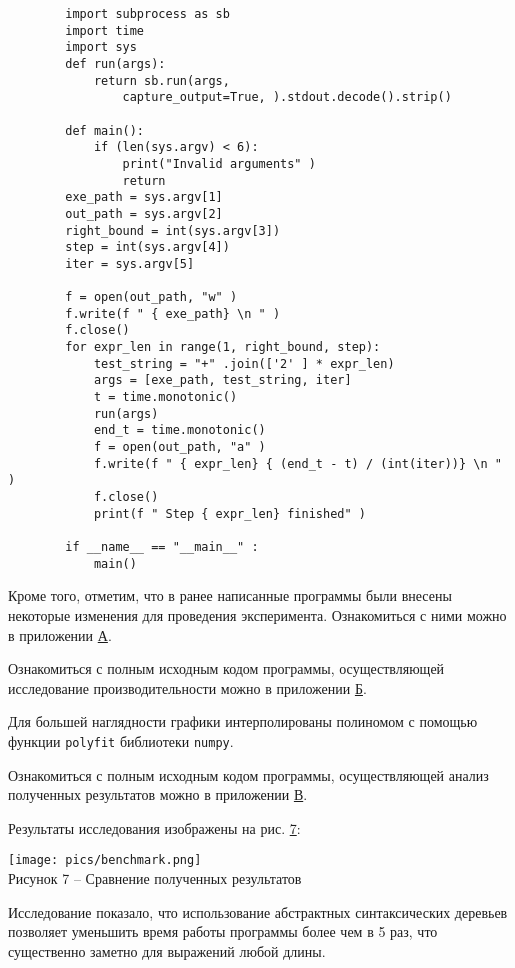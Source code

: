 \documentclass[bachelor, och, coursework]{SCWorks}
\begin{document}
    \begin{verbatim}
        import subprocess as sb
        import time
        import sys
        def run(args):
            return sb.run(args,
                capture_output=True, ).stdout.decode().strip()

        def main():
            if (len(sys.argv) < 6):
                print("Invalid arguments" )
                return
        exe_path = sys.argv[1]
        out_path = sys.argv[2]
        right_bound = int(sys.argv[3])
        step = int(sys.argv[4])
        iter = sys.argv[5]

        f = open(out_path, "w" )
        f.write(f " { exe_path} \n " )
        f.close()
        for expr_len in range(1, right_bound, step):
            test_string = "+" .join(['2' ] * expr_len)
            args = [exe_path, test_string, iter]
            t = time.monotonic()
            run(args)
            end_t = time.monotonic()
            f = open(out_path, "a" )
            f.write(f " { expr_len} { (end_t - t) / (int(iter))} \n " )
            f.close()
            print(f " Step { expr_len} finished" )

        if __name__ == "__main__" :
            main()
    \end{verbatim}

    Кроме того, отметим, что в ранее написанные программы были внесены некоторые изменения для 
    проведения эксперимента. Ознакомиться с ними можно в приложении \hyperref[А]{А}.

    Ознакомиться с полным исходным кодом программы, осуществляющей 
    исследование производительности можно в приложении \hyperref[Б]{Б}.

    Для большей наглядности графики интерполированы полиномом с помощью функции \verb"polyfit" библиотеки \verb"numpy".

    Ознакомиться с полным исходным кодом программы, осуществляющей 
    анализ полученных результатов можно в приложении \hyperref[В]{В}.

    Результаты исследования изображены на рис. \hyperref[7]{7}:

    \begin{center}
        \texttt{[image: pics/benchmark.png]}\\
        {\small Рисунок  7 – Сравнение полученных результатов}\label{7}
    \end{center}

    Исследование показало, что использование абстрактных синтаксических деревьев позволяет уменьшить время 
    работы программы более чем в 5 раз, что существенно заметно для выражений любой длины.
\end{document}

